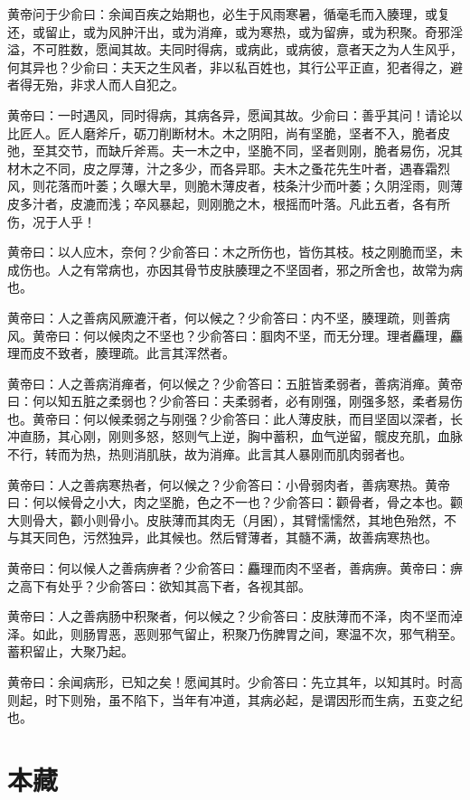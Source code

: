 \documentclass[12pt,UTF8]{ctexbook}
\begin{document}
	黄帝问于少俞曰：余闻百疾之始期也，必生于风雨寒暑，循毫毛而入腠理，或复还，或留止，或为风肿汗出，或为消瘅，或为寒热，或为留痹，或为积聚。奇邪淫溢，不可胜数，愿闻其故。夫同时得病，或病此，或病彼，意者天之为人生风乎，何其异也？少俞曰：夫天之生风者，非以私百姓也，其行公平正直，犯者得之，避者得无殆，非求人而人自犯之。
	
	黄帝曰：一时遇风，同时得病，其病各异，愿闻其故。少俞曰：善乎其问！请论以比匠人。匠人磨斧斤，砺刀削断材木。木之阴阳，尚有坚脆，坚者不入，脆者皮弛，至其交节，而缺斤斧焉。夫一木之中，坚脆不同，坚者则刚，脆者易伤，况其材木之不同，皮之厚薄，汁之多少，而各异耶。夫木之蚤花先生叶者，遇春霜烈风，则花落而叶萎；久曝大旱，则脆木薄皮者，枝条汁少而叶萎；久阴淫雨，则薄皮多汁者，皮漉而浅；卒风暴起，则刚脆之木，根摇而叶落。凡此五者，各有所伤，况于人乎！
	
	黄帝曰：以人应木，奈何？少俞答曰：木之所伤也，皆伤其枝。枝之刚脆而坚，未成伤也。人之有常病也，亦因其骨节皮肤腠理之不坚固者，邪之所舍也，故常为病也。
	
	黄帝曰：人之善病风厥漉汗者，何以候之？少俞答曰：内不坚，腠理疏，则善病风。黄帝曰：何以候肉之不坚也？少俞答曰：腘肉不坚，而无分理。理者麤理，麤理而皮不致者，腠理疏。此言其浑然者。
	
	黄帝曰：人之善病消瘅者，何以候之？少俞答曰：五脏皆柔弱者，善病消瘅。黄帝曰：何以知五脏之柔弱也？少俞答曰：夫柔弱者，必有刚强，刚强多怒，柔者易伤也。黄帝曰：何以候柔弱之与刚强？少俞答曰：此人薄皮肤，而目坚固以深者，长冲直肠，其心刚，刚则多怒，怒则气上逆，胸中蓄积，血气逆留，髋皮充肌，血脉不行，转而为热，热则消肌肤，故为消瘅。此言其人暴刚而肌肉弱者也。
	
	黄帝曰：人之善病寒热者，何以候之？少俞答曰：小骨弱肉者，善病寒热。黄帝曰：何以候骨之小大，肉之坚脆，色之不一也？少俞答曰：颧骨者，骨之本也。颧大则骨大，颧小则骨小。皮肤薄而其肉无（月囷），其臂懦懦然，其地色殆然，不与其天同色，污然独异，此其候也。然后臂薄者，其髓不满，故善病寒热也。
	
	黄帝曰：何以候人之善病痹者？少俞答曰：麤理而肉不坚者，善病痹。黄帝曰：痹之高下有处乎？少俞答曰：欲知其高下者，各视其部。
	
	黄帝曰：人之善病肠中积聚者，何以候之？少俞答曰：皮肤薄而不泽，肉不坚而淖泽。如此，则肠胃恶，恶则邪气留止，积聚乃伤脾胃之间，寒温不次，邪气稍至。蓄积留止，大聚乃起。
	
	黄帝曰：余闻病形，已知之矣！愿闻其时。少俞答曰：先立其年，以知其时。时高则起，时下则殆，虽不陷下，当年有冲道，其病必起，是谓因形而生病，五变之纪也。

	\chapter{本藏}
	
\end{document}
